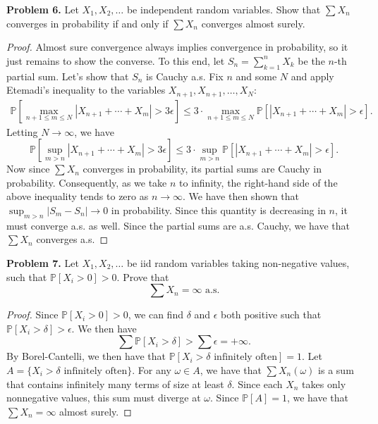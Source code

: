 \documentclass[11pt,letterpaper]{report}
\newcommand{\Prob}{\mathbb{P}}
\begin{document}
\noindent\textbf{Problem 6. }
Let $X_1, X_2, \ldots$ be independent random variables. Show that $\sum X_n$ converges in probability if and only if $\sum X_n$ converges almost surely.
\begin{proof}
	Almost sure convergence always implies convergence in probability, so it just remains to show the converse. To this end, let $S_n = \sum_{k=1}^n X_k$ be the $n$-th partial sum. Let's show that $S_n$ is Cauchy a.s. Fix $n$ and some $N$ and apply Etemadi's inequality to the variables $X_{n+1}, X_{n+1}, \ldots, X_N$:
	\begin{align*}
		\Prob\left[\max_{n+1\leq m\leq N}|X_{n+1} + \cdots + X_m|>3\epsilon\right] \leq 3\cdot \max_{n+1\leq m\leq N}\Prob[|X_{n+1} + \cdots + X_m| > \epsilon].
	\end{align*}
	Letting $N\to \infty$, we have
	\[
	\Prob\left[\sup_{m>n}|X_{n+1} + \cdots + X_m|>3\epsilon\right] \leq 3\cdot \sup_{m>n}\Prob[|X_{n+1} + \cdots + X_m| > \epsilon].
	\]
	Now since $\sum X_n$ converges in probability, its partial sums are Cauchy in probability. Consequently, as we take $n$ to infinity, the right-hand side of the above inequality tends to zero as $n\to \infty$. We have then shown that $\sup_{m>n}|S_m - S_n| \to 0$ in probability. Since this quantity is decreasing in $n$, it must converge a.s. as well. Since the partial sums are a.s. Cauchy, we have that $\sum X_n$ converges a.s.
\end{proof}

\noindent\textbf{Problem 7. }
Let $X_1, X_2, \ldots$ be iid random variables taking non-negative values, such that $\Prob[X_i>0]>0$. Prove that
\[
\sum X_n  = \infty \text{ a.s.}
\]
\begin{proof}
	Since $\Prob[X_i>0]>0$, we can find $\delta$ and $\epsilon$ both positive such that $\Prob[X_i> \delta]>\epsilon$. We then have
	\[
	\sum \Prob[X_i > \delta] > \sum \epsilon = +\infty.
	\]
	By Borel-Cantelli, we then have that $\Prob[X_i > \delta\text{ infinitely often}] = 1$. Let $A = \{X_i > \delta \text{ infinitely often}\}$. For any $\omega \in A$, we have that $\sum X_n(\omega)$ is a sum that contains infinitely many terms of size at least $\delta$. Since each $X_n$ takes only nonnegative values, this sum must diverge at $\omega$. Since $\Prob[A] = 1$, we have that $\sum X_n = \infty$ almost surely.
\end{proof}
\end{document}
